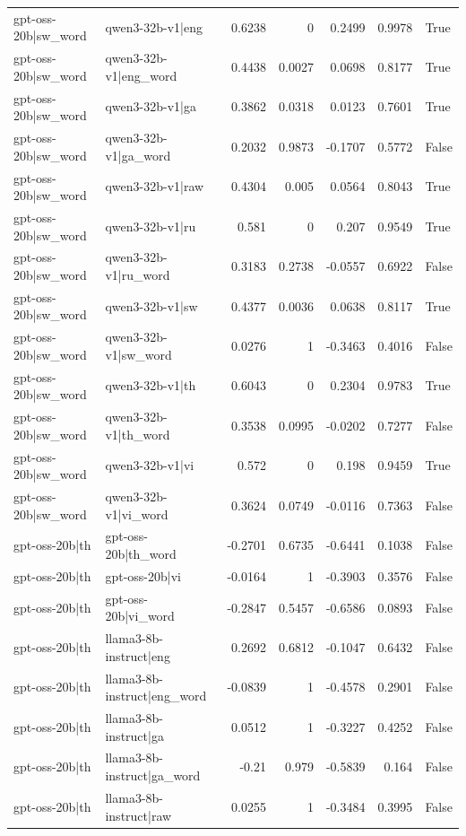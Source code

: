 \begin{table}
\begin{tabular}{l l r r r r l}
gpt-oss-20b|sw_word & qwen3-32b-v1|eng & 0.6238 & 0 & 0.2499 & 0.9978 & True \\
gpt-oss-20b|sw_word & qwen3-32b-v1|eng_word & 0.4438 & 0.0027 & 0.0698 & 0.8177 & True \\
gpt-oss-20b|sw_word & qwen3-32b-v1|ga & 0.3862 & 0.0318 & 0.0123 & 0.7601 & True \\
gpt-oss-20b|sw_word & qwen3-32b-v1|ga_word & 0.2032 & 0.9873 & -0.1707 & 0.5772 & False \\
gpt-oss-20b|sw_word & qwen3-32b-v1|raw & 0.4304 & 0.005 & 0.0564 & 0.8043 & True \\
gpt-oss-20b|sw_word & qwen3-32b-v1|ru & 0.581 & 0 & 0.207 & 0.9549 & True \\
gpt-oss-20b|sw_word & qwen3-32b-v1|ru_word & 0.3183 & 0.2738 & -0.0557 & 0.6922 & False \\
gpt-oss-20b|sw_word & qwen3-32b-v1|sw & 0.4377 & 0.0036 & 0.0638 & 0.8117 & True \\
gpt-oss-20b|sw_word & qwen3-32b-v1|sw_word & 0.0276 & 1 & -0.3463 & 0.4016 & False \\
gpt-oss-20b|sw_word & qwen3-32b-v1|th & 0.6043 & 0 & 0.2304 & 0.9783 & True \\
gpt-oss-20b|sw_word & qwen3-32b-v1|th_word & 0.3538 & 0.0995 & -0.0202 & 0.7277 & False \\
gpt-oss-20b|sw_word & qwen3-32b-v1|vi & 0.572 & 0 & 0.198 & 0.9459 & True \\
gpt-oss-20b|sw_word & qwen3-32b-v1|vi_word & 0.3624 & 0.0749 & -0.0116 & 0.7363 & False \\
gpt-oss-20b|th & gpt-oss-20b|th_word & -0.2701 & 0.6735 & -0.6441 & 0.1038 & False \\
gpt-oss-20b|th & gpt-oss-20b|vi & -0.0164 & 1 & -0.3903 & 0.3576 & False \\
gpt-oss-20b|th & gpt-oss-20b|vi_word & -0.2847 & 0.5457 & -0.6586 & 0.0893 & False \\
gpt-oss-20b|th & llama3-8b-instruct|eng & 0.2692 & 0.6812 & -0.1047 & 0.6432 & False \\
gpt-oss-20b|th & llama3-8b-instruct|eng_word & -0.0839 & 1 & -0.4578 & 0.2901 & False \\
gpt-oss-20b|th & llama3-8b-instruct|ga & 0.0512 & 1 & -0.3227 & 0.4252 & False \\
gpt-oss-20b|th & llama3-8b-instruct|ga_word & -0.21 & 0.979 & -0.5839 & 0.164 & False \\
gpt-oss-20b|th & llama3-8b-instruct|raw & 0.0255 & 1 & -0.3484 & 0.3995 & False \\

\end{tabular}
\end{table}
